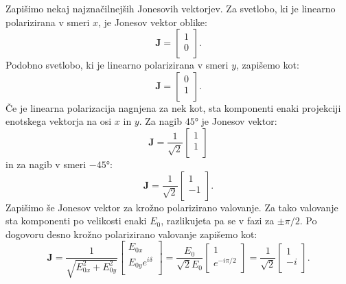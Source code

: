 Zapišimo nekaj najznačilnejših Jonesovih vektorjev. Za svetlobo, ki 
je linearno polarizirana v smeri $x$, je Jonesov vektor oblike:
\begin{equation}
\mathbf{J} = \left[\begin{array}{c}
1\\
0\\
\end{array}\right]\!\!.
\label{eq:03_42}
\end{equation}
Podobno svetlobo, ki je linearno polarizirana v smeri $y$, zapišemo kot:
\begin{equation}
\mathbf{J} = \left[\begin{array}{c}
0\\
1\\
\end{array}\right]\!\!.
\label{eq:03_43}
\end{equation}
Če je linearna polarizacija nagnjena za nek kot, sta komponenti enaki projekciji
enotskega vektorja na osi $x$ in $y$. Za nagib $45\si{\degree}$ je
Jonesov vektor:
\begin{equation}
\mathbf{J} = \frac{1}{\sqrt{2}}\left[\begin{array}{c}
1\\
1\\
\end{array}\right]
\label{eq:03_44}
\end{equation}
in za nagib v smeri $-45\si{\degree}$:
\begin{equation}
\mathbf{J} = \frac{1}{\sqrt{2}}\left[\begin{array}{c}
1\\
-1\\
\end{array}\right]\!\!.
\label{eq:03_45}
\end{equation}
Zapišimo še Jonesov vektor za krožno polarizirano
valovanje. Za tako valovanje sta komponenti po velikosti enaki $E_0$, 
razlikujeta pa se v fazi za $\pm \pi/2$.
Po dogovoru desno krožno polarizirano valovanje zapišemo kot:
\begin{equation}
\mathbf{J} = \frac{1}{\sqrt{E_{0x}^2+E_{0y}^2}}
\left[\begin{array}{c}
E_{0x}\\
E_{0y} e^{i \delta}\\
\end{array}\right] = 
\frac{E_0}{\sqrt{2}E_{0}}
\left[\begin{array}{c}
1\\
e^{-i \pi/2}\\
\end{array}\right] =
\frac{1}{\sqrt{2}}
\left[\begin{array}{c}
1\\
-i\\
\end{array}\right]\!\!.
\label{eq:03_46}
\end{equation}
